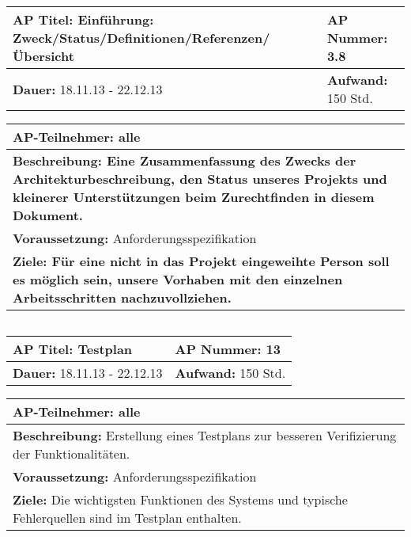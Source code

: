 \begin{tabular}{|p{7.43cm}|p{7.43cm}|}
\hline
\textbf{AP Titel: }Einführung: Zweck/Status/Definitionen/Referenzen/Übersicht & \textbf{AP Nummer: }3.8\\ 
\hline
\textbf{Dauer: }18.11.13 - 22.12.13& \textbf{Aufwand: }150 Std.\\
\hline
\end{tabular}
\begin{tabular}{|p{15.3cm}|}
\hline
\textbf{AP-Teilnehmer: }alle\\
\hline
\textbf{Beschreibung: Eine Zusammenfassung des Zwecks der Architekturbeschreibung, den Status unseres Projekts und kleinerer Unterstützungen beim Zurechtfinden in diesem Dokument.}\\
\hline
\textbf{Voraussetzung: }Anforderungsspezifikation\\
\hline 
\textbf{Ziele: Für eine nicht in das Projekt eingeweihte Person soll es möglich sein, unsere Vorhaben mit den einzelnen Arbeitsschritten nachzuvollziehen.}\\
\hline 
\end{tabular}
\begin{verbatim}

\end{verbatim}

\begin{tabular}{|p{7.43cm}|p{7.43cm}|}
\hline
\textbf{AP Titel: }Testplan & \textbf{AP Nummer: }13\\ 
\hline
\textbf{Dauer: }18.11.13 - 22.12.13& \textbf{Aufwand: }150 Std.\\
\hline
\end{tabular}
\begin{tabular}{|p{15.3cm}|}
\hline
\textbf{AP-Teilnehmer: }alle\\
\hline
\textbf{Beschreibung: } Erstellung eines Testplans zur besseren Verifizierung der Funktionalitäten. \\
\hline
\textbf{Voraussetzung: }Anforderungsspezifikation\\
\hline 
\textbf{Ziele: } Die wichtigsten Funktionen des Systems und typische Fehlerquellen sind im Testplan enthalten. \\
\hline 
\end{tabular}
\begin{verbatim}

\end{verbatim}

